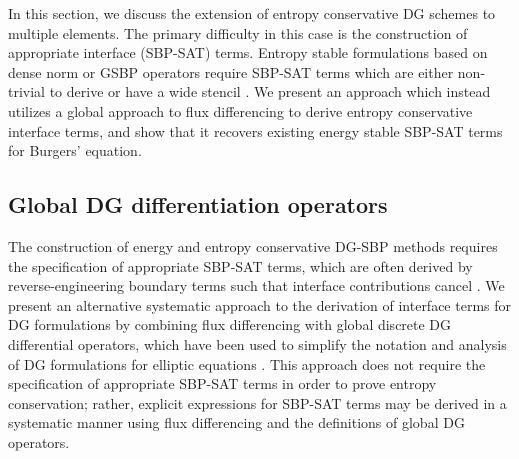\documentclass[preprint,10pt]{article}
\theoremstyle{definition}
\theoremstyle{lemma}
\theoremstyle{theorem}
\theoremstyle{assumption}
\begin{document}
In this section, we discuss the extension of entropy conservative DG schemes to multiple elements.  The primary difficulty in this case is the construction of appropriate interface (SBP-SAT) terms.  Entropy stable formulations based on dense norm or GSBP operators require SBP-SAT terms which are either non-trivial to derive or have a wide stencil \cite{fernandez2016simultaneous, ranocha2017extended}.  We present an approach which instead utilizes a global approach to flux differencing to derive entropy conservative interface terms, and show that it recovers existing energy stable SBP-SAT terms for Burgers' equation.  

\subsection{Global DG differentiation operators}

The construction of energy and entropy conservative DG-SBP methods requires the specification of appropriate SBP-SAT terms, which are often derived by reverse-engineering  boundary terms such that interface contributions cancel \cite{fernandez2016simultaneous, ranocha2017comparison, ranocha2017extended}.  We present an alternative systematic approach to the derivation of interface terms for DG formulations by combining flux differencing with global discrete DG differential operators, which have been used to simplify the notation and analysis of DG formulations for elliptic equations \cite{di2011mathematical, wang2013weak}.  This approach does not require the specification of appropriate SBP-SAT terms in order to prove entropy conservation; rather, explicit expressions for SBP-SAT terms may be derived in a systematic manner using flux differencing and the definitions of global DG operators.  

\end{document}
